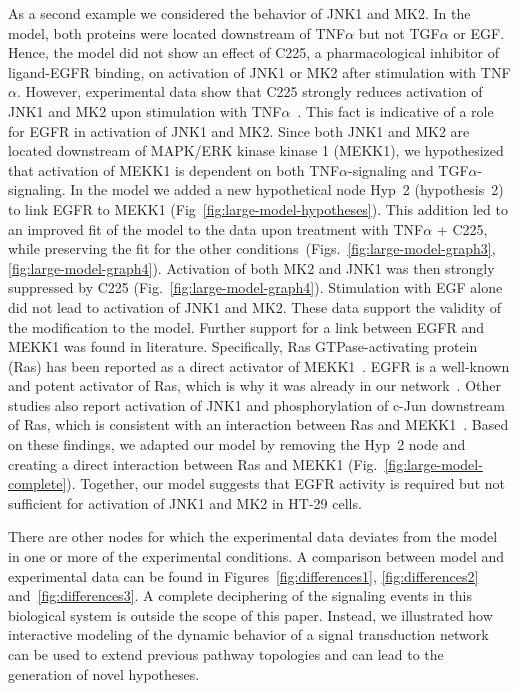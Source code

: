 As a second example we considered the behavior of JNK1 and MK2. In the model, both
 proteins were located downstream of TNF$\alpha$ but not TGF$\alpha$ or EGF. Hence, the
 model did not show an effect of C225, a pharmacological inhibitor of ligand-EGFR
 binding, on activation of JNK1 or MK2 after stimulation with TNF$\alpha$. However, experimental
data show that C225 strongly reduces activation of JNK1 and MK2 upon stimulation with TNF$\alpha$~\citep{pathway-autocrine}.
This fact is indicative of a role for EGFR in activation of JNK1 and MK2. Since both JNK1 and MK2
 are located downstream of MAPK/ERK kinase kinase 1 (MEKK1), we hypothesized that activation
 of MEKK1 is dependent on
 both TNF$\alpha$-signaling and TGF$\alpha$-signaling. In the model we added a new
 hypothetical node {\sf Hyp~2} (hypothesis~2) to link EGFR to MEKK1 (Fig~\ref{fig:large-model-hypotheses}).
This addition led to an improved fit of the model to the data upon treatment with TNF$\alpha$ + C225, while preserving the fit
for the other conditions~(Figs.~\ref{fig:large-model-graph3}, \ref{fig:large-model-graph4}). Activation of both MK2 and JNK1
was then strongly suppressed by C225 (Fig.~\ref{fig:large-model-graph4}).
 Stimulation with EGF alone did not lead to activation of JNK1 and MK2.
These data support the validity of the modification to the model.
 Further support for a link between EGFR and MEKK1 was found in literature. Specifically,
Ras GTPase-activating protein (Ras) has been reported as a direct activator of
 MEKK1~\citep{ras-mekk1}. EGFR is a well-known and potent activator of Ras,
 which is why it was already in our network~\citep{kegg}.
Other studies also report activation of JNK1 and phosphorylation of c-Jun downstream of Ras, which is consistent with
 an interaction between Ras and MEKK1~\citep{cfos-cjun,ras-jnk1}.
Based on these findings, we adapted
 our model by removing the {\sf Hyp~2} node and creating a direct interaction between Ras
 and MEKK1 (Fig.~\ref{fig:large-model-complete}). Together, our model suggests that EGFR activity is required but not sufficient for
 activation of JNK1 and MK2 in HT-29 cells.


There are other nodes for which the experimental data deviates from the model in one or more of the experimental conditions.
A comparison between model and experimental data can be found in Figures~\ref{fig:differences1}, \ref{fig:differences2} and~\ref{fig:differences3}.
A complete deciphering of the signaling events
in this biological system is outside the scope of this paper. Instead, we illustrated how interactive modeling of the dynamic behavior
of a signal transduction network can be used to extend previous pathway topologies and can lead to the generation of novel hypotheses.
